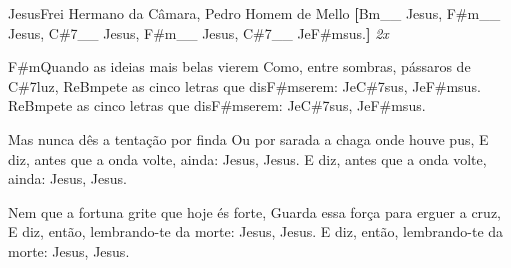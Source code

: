 \begin{musica}{Jesus}{Frei Hermano da Câmara, Pedro Homem de Mello}{}
\textbf{[}\ac{Bm}{}__ Jesus, \ac{F#m}{}__ Jesus, \ac{C#7}{}__ Jesus, \ac{F#m}{}__ Jesus, \ac{C#7}{}__ Je\ac{F#m}{sus}.\textbf{]} \textit{2x}

\ac{F#m}{Quan}do as ideias mais belas vierem
Como, entre sombras, pássaros de \ac{C#7}{luz},
Re\ac{Bm}{pe}te as cinco letras que dis\ac{F#m}{se}rem:
Je\ac{C#7}{sus}, Je\ac{F#m}{sus}.
Re\ac{Bm}{pe}te as cinco letras que dis\ac{F#m}{se}rem:
Je\ac{C#7}{sus}, Je\ac{F#m}{sus}.


Mas nunca dês a tentação por finda
Ou por sarada a chaga onde houve pus,
E diz, antes que a onda volte, ainda:
Jesus, Jesus.
E diz, antes que a onda volte, ainda:
Jesus, Jesus.


Nem que a fortuna grite que hoje és forte,
Guarda essa força para erguer a cruz,
E diz, então, lembrando-te da morte:
Jesus, Jesus.
E diz, então, lembrando-te da morte:
Jesus, Jesus.

\end{musica}
